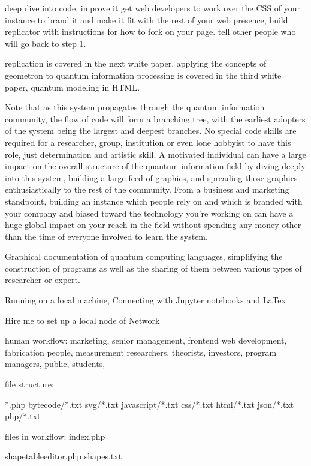 \documentclass[11pt]{article}
\begin{document}
deep dive into code, improve it
get web developers to work over the CSS of your instance to brand it and make it fit with the rest of your web presence, build replicator with instructions for how to fork on your page. 
tell other people who will go back to step 1.

replication is covered in the next white paper.
applying the concepts of geometron to quantum information processing is covered in the third white paper, quantum modeling in HTML.

Note that as this system propagates through the quantum information community, the flow of code will form a branching tree, with the earliest adopters of the system being the largest and deepest branches.  No special code skills are required for a researcher, group, institution or even lone hobbyist to have this role, just determination and artistic skill.  A motivated individual can have a large impact on the overall structure of the quantum information field by diving deeply into this system, building a large feed of graphics, and spreading those graphics enthusiastically to the rest of the community.  From a business and marketing standpoint, building an instance which people rely on  and which is branded with your company and biased toward the technology you're working on can have a huge global impact on your reach in the field without spending any money other than the time of everyone involved to learn the system.  





    Graphical documentation of quantum computing languages, simplifying the construction of programs as well as the sharing of them between various types of researcher or expert.




    Running on a local machine, Connecting with Jupyter notebooks and LaTex


Hire me to set up a local node of Network

human workflow: marketing, senior management, frontend web development, fabrication people, measurement researchers, theorists, investors, program managers, public, students, 

file structure:

*.php
bytecode/*.txt
svg/*.txt
javascript/*.txt
css/*.txt
html/*.txt
json/*.txt
php/*.txt


files in workflow:
index.php

shapetableeditor.php
shapes.txt
\end{document}

